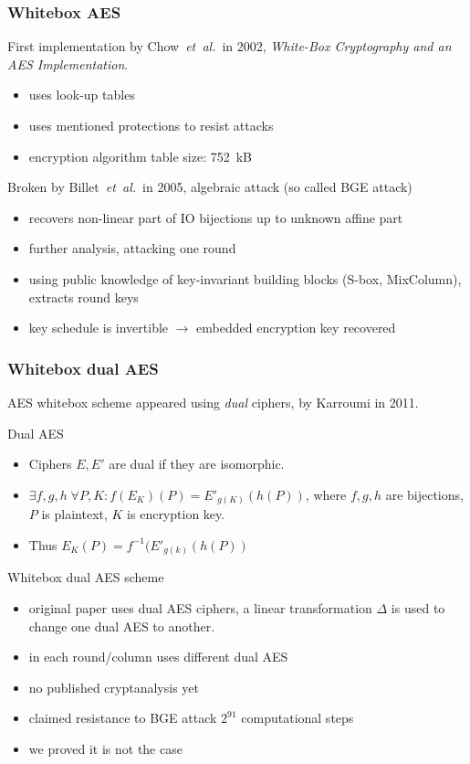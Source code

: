 \documentclass{beamer}
\newcommand{\eal}{\emph{et~al.}}
\begin{document}
\begin{frame}
    \frametitle{Whitebox AES}
    First implementation by Chow~\eal~in 2002, {\it{White-Box Cryptography and an AES Implementation}}.
    \begin{itemize}
     \item uses look-up tables
     \item uses mentioned protections to resist attacks
     \item encryption algorithm table size: 752~kB
    \end{itemize} \pause
    
    Broken by Billet~\eal~in 2005, algebraic attack (so called BGE attack) 
    \begin{itemize}
     \item recovers non-linear part of IO bijections up to unknown affine part
     \item further analysis, attacking one round
     \item using public knowledge of key-invariant building blocks (S-box, MixColumn), extracts round keys
     \item key schedule is invertible $\rightarrow$ embedded encryption key recovered
    \end{itemize}
\end{frame}

\begin{frame}
    \frametitle{Whitebox dual AES}
    AES whitebox scheme appeared using \emph{dual} ciphers, by Karroumi in 2011.
    \begin{block}{Dual AES}
	\begin{itemize}
	\item Ciphers $E, E'$ are dual if they are isomorphic. 
	\item $ \exists f,g,h \; \forall P,K: f\left(E_K\right)\left(P\right) = E'_{g(K)}\left(h \left(P\right)\right)$, 
	where $f,g,h$ are bijections, $P$ is plaintext, $K$ is encryption key.
	\item Thus $E_K(P) = f^{-1}(E'_{g(k)}(h(P))$
	\end{itemize}
    \end{block} \pause
    
    \bigskip
    Whitebox dual AES scheme
    \begin{itemize}
     \item original paper uses dual AES ciphers, a linear transformation $\Delta$ is used to change one dual AES to another.
     \item in each round/column uses different dual AES
     \item no published cryptanalysis yet
     \item claimed resistance to BGE attack $2^{91}$ computational steps
     \item we proved it is not the case
    \end{itemize}   
\end{frame}
\end{document}
